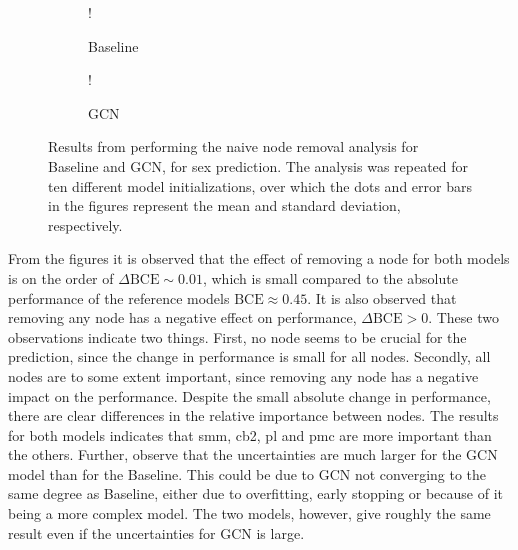 \begin{figure}[!htbp]
    \centering
        \begin{subfigure}{.5\textwidth}
            \centering
            \begin{center}
                \resizebox {1.0\linewidth} {!} {
                    
                }
            \end{center}
            \caption{Baseline}
            \label{fig:naive_sex_baseline}
        \end{subfigure}%
        \begin{subfigure}{.5\textwidth}
            \centering
            \begin{center}
                \resizebox {1.0\linewidth} {!} {
                    
                }
            \end{center}
            \caption{GCN}
            \label{fig:naive_sex_gcn}
        \end{subfigure}
    \caption{Results from performing the naive node removal analysis for Baseline and GCN, for sex prediction. The analysis was repeated for ten different model initializations, over which the dots and error bars in the figures represent the mean and standard deviation, respectively.}
    \label{fig:naive_sex}
\end{figure}

From the figures it is observed that the effect of removing a node for both models is on the order of $\Delta \text{BCE} \sim 0.01$, which is small compared to the absolute performance of the reference models $\text{BCE} \approx 0.45$. It is also observed that removing any node has a negative effect on performance, $\Delta\text{BCE}>0$. These two observations indicate two things. First, no node seems to be crucial for the prediction, since the change in performance is small for all nodes. Secondly, all nodes are to some extent important, since removing any node has a negative impact on the performance. Despite the small absolute change in performance, there are clear differences in the relative importance between nodes. The results for both models indicates that \acrshort{smm}, \acrshort{cb2}, \acrshort{pl} and \acrshort{pmc} are more important than the others. Further, observe that the uncertainties are much larger for the GCN model than for the Baseline. This could be due to GCN not converging to the same degree as Baseline, either due to overfitting, early stopping or because of it being a more complex model. The two models, however, give roughly the same result even if the uncertainties for GCN is large. 

